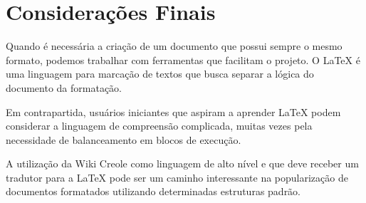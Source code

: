 \documentclass{article}
\begin{document}
\section{Considerações Finais}
\label{sec:consideracoes}

Quando é necessária a criação de um documento que possui sempre o mesmo formato,
podemos trabalhar com ferramentas que facilitam o projeto. O \LaTeX{} é uma
linguagem para marcação de textos que busca separar a lógica do documento da
formatação.

Em contrapartida, usuários iniciantes que aspiram a aprender \LaTeX{} podem
considerar a linguagem de compreensão complicada, muitas vezes pela necessidade
de balanceamento em blocos de execução.

A utilização da Wiki Creole como linguagem de alto nível e que deve receber um
tradutor para a \LaTeX{} pode ser um caminho interessante na popularização de
documentos formatados utilizando determinadas estruturas padrão.



\end{document}
